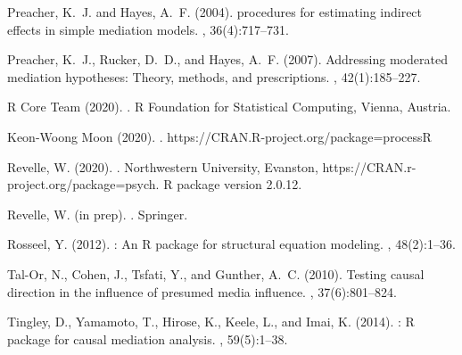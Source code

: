 \documentclass[11pt]{article}
\begin{document}
\begin{thebibliography}{}
Preacher, K.~J. and Hayes, A.~F. (2004).
 procedures for estimating indirect effects in simple
  mediation models.
,
  36(4):717--731.

Preacher, K.~J., Rucker, D.~D., and Hayes, A.~F. (2007).
\newblock Addressing moderated mediation hypotheses: Theory, methods, and
  prescriptions.
, 42(1):185--227.

{R Core Team} (2020).
.
\newblock R Foundation for Statistical Computing, Vienna, Austria.


{Keon-Woong Moon} (2020).
.
\newblock https://CRAN.R-project.org/package=processR

Revelle, W. (2020).
.
\newblock Northwestern University, Evanston,
  https://CRAN.r-project.org/package=psych.
\newblock R package version 2.0.12.

Revelle, W. ({in prep}).
.
\newblock Springer.

Rosseel, Y. (2012).
: An {R} package for structural equation modeling.
, 48(2):1--36.

Tal-Or, N., Cohen, J., Tsfati, Y., and Gunther, A.~C. (2010).
\newblock Testing causal direction in the influence of presumed media
  influence.
, 37(6):801--824.

Tingley, D., Yamamoto, T., Hirose, K., Keele, L., and Imai, K. (2014).
: {R} package for causal mediation analysis.
, 59(5):1--38.

\end{thebibliography}


\end{document}
